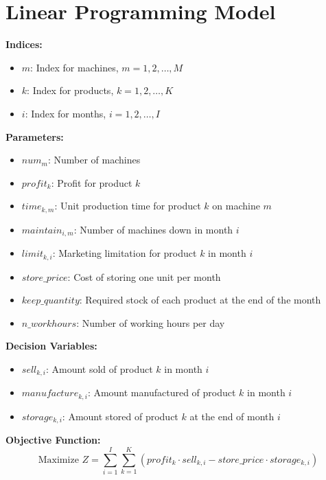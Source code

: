 \documentclass{article}
\begin{document}
\section*{Linear Programming Model}

\textbf{Indices:}
\begin{itemize}
    \item $m$: Index for machines, $m = 1, 2, \ldots, M$
    \item $k$: Index for products, $k = 1, 2, \ldots, K$
    \item $i$: Index for months, $i = 1, 2, \ldots, I$
\end{itemize}

\textbf{Parameters:}
\begin{itemize}
    \item $num_{m}$: Number of machines
    \item $profit_{k}$: Profit for product $k$
    \item $time_{k, m}$: Unit production time for product $k$ on machine $m$
    \item $maintain_{i, m}$: Number of machines down in month $i$
    \item $limit_{k, i}$: Marketing limitation for product $k$ in month $i$
    \item $store\_price$: Cost of storing one unit per month
    \item $keep\_quantity$: Required stock of each product at the end of the month
    \item $n\_workhours$: Number of working hours per day
\end{itemize}

\textbf{Decision Variables:}
\begin{itemize}
    \item $sell_{k, i}$: Amount sold of product $k$ in month $i$
    \item $manufacture_{k, i}$: Amount manufactured of product $k$ in month $i$
    \item $storage_{k, i}$: Amount stored of product $k$ at the end of month $i$
\end{itemize}

\textbf{Objective Function:}
\[
\text{Maximize } Z = \sum_{i=1}^{I} \sum_{k=1}^{K} \left( profit_{k} \cdot sell_{k, i} - store\_price \cdot storage_{k, i} \right)
\]
\end{document}
